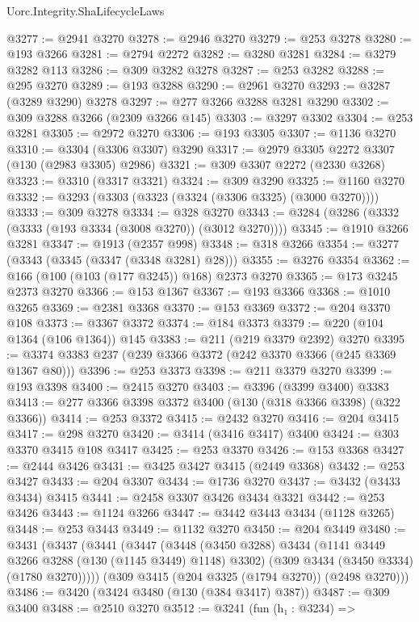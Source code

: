 \begin{lexlean}{Uorc.Integrity.ShaLifecycleLaws}
\begin{coremodule}
@3277 := @2941 @3270
@3278 := @2946 @3270
@3279 := @253 @3278
@3280 := @193 @3266
@3281 := @2794 @2272
@3282 := @3280 @3281
@3284 := @3279 @3282 @113
@3286 := @309 @3282 @3278
@3287 := @253 @3282
@3288 := @295 @3270
@3289 := @193 @3288
@3290 := @2961 @3270
@3293 := @3287 (@3289 @3290) @3278
@3297 := @277 @3266 @3288 @3281 @3290
@3302 := @309 @3288 @3266 (@2309 @3266 @145)
@3303 := @3297 @3302
@3304 := @253 @3281
@3305 := @2972 @3270
@3306 := @193 @3305
@3307 := @1136 @3270
@3310 := @3304 (@3306 @3307) @3290
@3317 := @2979 @3305 @2272 @3307 (@130 (@2983 @3305) @2986)
@3321 := @309 @3307 @2272 (@2330 @3268)
@3323 := @3310 (@3317 @3321)
@3324 := @309 @3290
@3325 := @1160 @3270
@3332 := @3293 (@3303 (@3323 (@3324 (@3306 @3325) (@3000 @3270))))
@3333 := @309 @3278
@3334 := @328 @3270
@3343 := @3284 (@3286 (@3332 (@3333 (@193 @3334 (@3008 @3270)) (@3012 @3270))))
@3345 := @1910 @3266 @3281
@3347 := @1913 (@2357 @998)
@3348 := @318 @3266
@3354 := @3277 (@3343 (@3345 (@3347 (@3348 @3281) @28)))
@3355 := @3276 @3354
@3362 := @166 (@100 (@103 (@177 @3245)) @168) @2373 @3270
@3365 := @173 @3245 @2373 @3270
@3366 := @153 @1367
@3367 := @193 @3366
@3368 := @1010 @3265
@3369 := @2381 @3368
@3370 := @153 @3369
@3372 := @204 @3370 @108
@3373 := @3367 @3372
@3374 := @184 @3373
@3379 := @220 (@104 @1364 (@106 @1364)) @145
@3383 := @211 (@219 @3379 @2392) @3270
@3395 := @3374 @3383 @237 (@239 @3366 @3372 (@242 @3370 @3366 (@245 @3369 @1367 @80)))
@3396 := @253 @3373
@3398 := @211 @3379 @3270
@3399 := @193 @3398
@3400 := @2415 @3270
@3403 := @3396 (@3399 @3400) @3383
@3413 := @277 @3366 @3398 @3372 @3400 (@130 (@318 @3366 @3398) (@322 @3366))
@3414 := @253 @3372
@3415 := @2432 @3270
@3416 := @204 @3415
@3417 := @298 @3270
@3420 := @3414 (@3416 @3417) @3400
@3424 := @303 @3370 @3415 @108 @3417
@3425 := @253 @3370
@3426 := @153 @3368
@3427 := @2444 @3426
@3431 := @3425 @3427 @3415 (@2449 @3368)
@3432 := @253 @3427
@3433 := @204 @3307
@3434 := @1736 @3270
@3437 := @3432 (@3433 @3434) @3415
@3441 := @2458 @3307 @3426 @3434 @3321
@3442 := @253 @3426
@3443 := @1124 @3266
@3447 := @3442 @3443 @3434 (@1128 @3265)
@3448 := @253 @3443
@3449 := @1132 @3270
@3450 := @204 @3449
@3480 := @3431
    (@3437
      (@3441
        (@3447
          (@3448
            (@3450 @3288)
            @3434
            (@1141 @3449 @3266 @3288 (@130 (@1145 @3449) @1148) @3302)
            (@309 @3434 (@3450 @3334) (@1780 @3270)))))
      (@309 @3415 (@204 @3325 (@1794 @3270)) (@2498 @3270)))
@3486 := @3420 (@3424 @3480 (@130 (@384 @3417) @387))
@3487 := @309 @3400
@3488 := @2510 @3270
@3512 := @3241
    (fun (h₁ : @3234) =>

\end{coremodule}
\end{lexlean}
